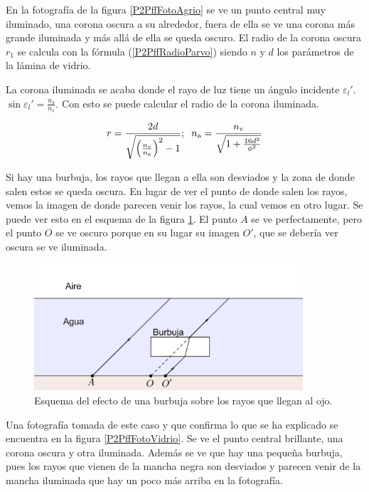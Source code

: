 \documentclass[12pt]{article}
\numberwithin{table}{section}
\numberwithin{figure}{section}
\numberwithin{equation}{section}
\DeclareMathOperator{\sen}{sin}
\begin{document}
En la fotografía de la figura \ref{P2PffFotoAgrio} se ve un punto central muy iluminado, una corona oscura a su alrededor, fuera de ella se ve una corona más grande iluminada y más allá de ella se queda oscuro. El radio de la corona oscura $r_1$ se calcula con la fórmula (\ref{P2PffRadioParvo}) siendo $n$ y $d$ los parámetros de la lámina de vidrio.

La corona iluminada se acaba donde el rayo de luz tiene un ángulo incidente $\varepsilon_l'$. $\sen\varepsilon_l'=\frac{n_\text{a}}{n_\text{v}}$. Con esto se puede calcular el radio de la corona iluminada.

\begin{equation}\label{P2PffRadioMagno}
	r=\frac{2d}{\sqrt{\left(\frac{n_\text{v}}{n_\text{a}}\right)^2-1}};\hspace{2mm}n_\text{a}=\frac{n_\text{v}}{\sqrt{1+\frac{16d^2}{\phi^2}}}
\end{equation}

Si hay una burbuja, los rayos que llegan a ella son desviados y la zona de donde salen estos se queda oscura. En lugar de ver el punto de donde salen los rayos, vemos la imagen de donde parecen venir los rayos, la cual vemos en otro lugar. Se puede ver esto en el esquema de la figura \ref{P2PffBurbuja}. El punto $A$ se ve perfectamente, pero el punto $O$ se ve oscuro porque en su lugar su imagen $O'$, que se debería ver oscura se ve iluminada.

\begin{figure}[!ht]
	\small \centering \sffamily
	\begin{center}
		\includegraphics[width=10cm]{P2PffBurbuja.png}
		\caption{Esquema del efecto de una burbuja sobre los rayos que llegan al ojo.}
		\label{P2PffBurbuja}
	\end{center}
\end{figure}

Una fotografía tomada de este caso y que confirma lo que se ha explicado se encuentra en la figura \ref{P2PffFotoVidrio}. Se ve el punto central brillante, una corona oscura y otra iluminada. Además se ve que hay una pequeña burbuja, pues los rayos que vienen de la mancha negra son desviados y parecen venir de la mancha iluminada que hay un poco más arriba en la fotografía.
\end{document}
